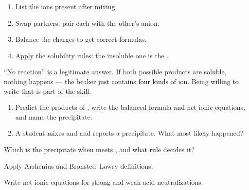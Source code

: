\documentclass{apchem-notes}
\begin{document}
\begin{enumerate}[leftmargin=*,itemsep=0.2em]
  \item List the ions present after mixing.
  \item Swap partners: pair each  with the
        other's anion.
  \item Balance the charges to get correct formulas.
  \item Apply the solubility rules; the insoluble one is the
        .
\end{enumerate}

\begin{apcnote}
``No reaction'' is a legitimate answer. If both possible products are
soluble, nothing happens --- the beaker just contains four kinds of ion.
Being willing to write that is part of the skill.
\end{apcnote}


\begin{enumerate}[leftmargin=*,itemsep=0.4em]
  \item Predict the products of , write the
        balanced formula and net ionic equations, and name the precipitate.
  \item A student mixes  and  and reports a
        precipitate. What most likely happened?
\end{enumerate}

\begin{exitticket}
Which is the precipitate when  meets , and what
rule decides it? 
\end{exitticket}


\begin{objectives}
  \item Apply Arrhenius and Bronsted--Lowry definitions.
  \item Write net ionic equations for strong and weak acid neutralizations.
\end{objectives}
\end{document}
